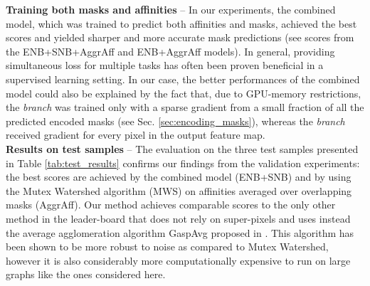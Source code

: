 \textbf{Training both masks and affinities} -- In our experiments, the combined model, which was trained to predict both affinities and \maskname masks, achieved the best scores and yielded sharper and more accurate mask predictions (see scores from the ENB+SNB+AggrAff and ENB+AggrAff models).
In general, providing simultaneous loss for multiple tasks has often been proven beneficial in a supervised learning setting.
In our case, the better performances of the combined model could also be explained by the fact that, due to GPU-memory restrictions, the \emph{\encBr branch} was trained only with a sparse gradient from a small fraction of all the predicted encoded masks (see Sec. \ref{sec:encoding_masks}), whereas the \emph{\sparseBr branch} received gradient for every pixel in the output feature map. \\





\textbf{Results on test samples} -- The evaluation on the three test samples presented in Table \ref{tab:test_results} confirms our findings from the validation experiments: the best scores are achieved by the combined model (ENB+SNB) and by using the Mutex Watershed algorithm (MWS) on affinities averaged over overlapping masks (AggrAff).
Our method achieves comparable scores to the only other method in the leader-board that does not rely on super-pixels and uses instead the average agglomeration algorithm GaspAvg proposed in \cite{bailoni2019generalized}. This algorithm has been shown to be more robust to noise as compared to Mutex Watershed, however it is also considerably more computationally expensive to run on large graphs like the ones considered here. 

